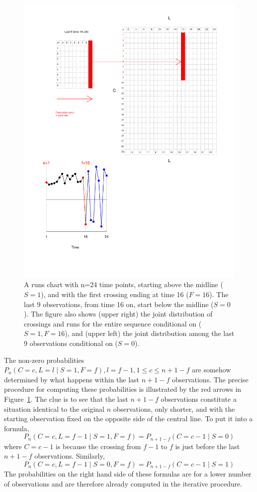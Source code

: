 \begin{figure}[htbp]
  \centering
  \caption{A runs chart with n=24 time points, starting above the 
  midline ($S=1$), and with the first crossing ending at time 16 ($F=16$). The last 9 observations, from time 16 on, start below the midline ($S=0$). The figure also shows (upper right) the joint distribution of crossings and runs for the entire sequence conditional on ($S=1, F=16$), and (upper left) the joint distribution among the last 9 observations conditional on ($S=0$).}
  \label{figure:rch}
  \includegraphics[width=\textwidth]{run24}
\end{figure}

The non-zero probabilities $P_n (C=c,L=l \mid S=1,F=f), l=f-1, 1 \leq c \leq n+1-f$ are somehow determined by what happens within the last $n+1-f$ observations. The precise procedure for computing these probabilities is illustrated by the red arrows in Figure~\ref{figure:rch}. The clue is to see that the last $n+1-f$ observations constitute a situation identical to the original $n$ observations, only shorter, and with the starting observation fixed on the opposite side of the central line. To put it into a formula, $$P_n (C=c,L=f-1 \mid S=1,F=f)=P_{n+1-f} (C=c-1 \mid S=0)$$ where $C=c-1$ is because the crossing from $f-1$ to $f$ is just before the last $n+1-f$ observations. Similarly, $$P_n (C=c,L=f-1 \mid S=0,F=f)=P_{n+1-f} (C=c-1 \mid S=1)$$ The probabilities on the right hand side of these formulas are for a lower number of observations and are therefore already computed in the iterative procedure. 

